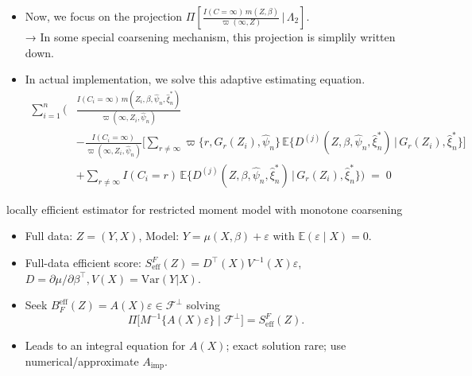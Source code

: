 \documentclass[xcolor=dvipsnames,aspectratio=169]{beamer}
\newcommand{\E}{\mathbb{E}}
\newcommand{\1}{\mathbbm{1}}
\begin{document}
\begin{frame}
  \begin{itemize}
    \item Now, we focus on the projection $\Pi\!\left[
  \frac{ I(C=\infty)\,m(Z,\beta) }{ \varpi(\infty,Z) }
  \,\Bigg|\, \Lambda_{2}
\right]$. \\
    → In some special coarsening mechanism, this projection is simplily written down.
    \item In actual implementation, we solve this adaptive estimating equation.
    \begin{align*}
\sum_{i=1}^{n} \Bigg(
  &\frac{ I(C_i=\infty)\, m(Z_i,\beta,\hat\psi_n,\hat\xi_n^{*}) }
        { \varpi(\infty,Z_i,\hat\psi_n) } \\[6pt]
  &- \frac{ I(C_i=\infty) }{ \varpi(\infty,Z_i,\hat\psi_n) }
     \Bigg[
       \sum_{r\neq\infty} \varpi\{r,G_r(Z_i),\hat\psi_n\}\,
         \E\!\Big\{ D^{(j)}(Z,\beta,\hat\psi_n,\hat\xi_n^{*})
             \,\Big|\, G_r(Z_i),\hat\xi_n^{*} \Big\}
     \Bigg] \\[6pt]
  &+ \sum_{r\neq\infty} I(C_i=r)\,
      \E\!\Big\{ D^{(j)}(Z,\beta,\hat\psi_n,\hat\xi_n^{*})
          \,\Big|\, G_r(Z_i),\hat\xi_n^{*} \Big\}
\Bigg) \;=\; 0
\end{align*}
  \end{itemize}
\end{frame}

\begin{frame}{locally efficient estimator for restricted moment model with monotone coarsening}
  \begin{itemize}
    \item Full data: $Z=(Y,X)$, Model: $Y=\mu(X,\beta)+\varepsilon$ with $\E(\varepsilon\mid X)=0$.
    \item Full-data efficient score: $S^F_{\text{eff}}(Z)=D^\top(X)V^{-1}(X)\varepsilon$, $D=\partial\mu/\partial\beta^\top, V(X)=\text{Var}(Y|X)$.
    \item Seek $B_F^{\text{eff}}(Z)=A(X)\varepsilon \in \mathcal{F}^{\perp}$ solving
    \[
      \Pi\!\big[M^{-1}\{A(X)\varepsilon\}\mid \mathcal{F}^{\perp}\big]=S^F_{\text{eff}}(Z).
    \]
    \item Leads to an integral equation for $A(X)$; exact solution rare; use numerical/approximate $A_{\text{imp}}$.
  \end{itemize}
\end{frame}
\end{document}
